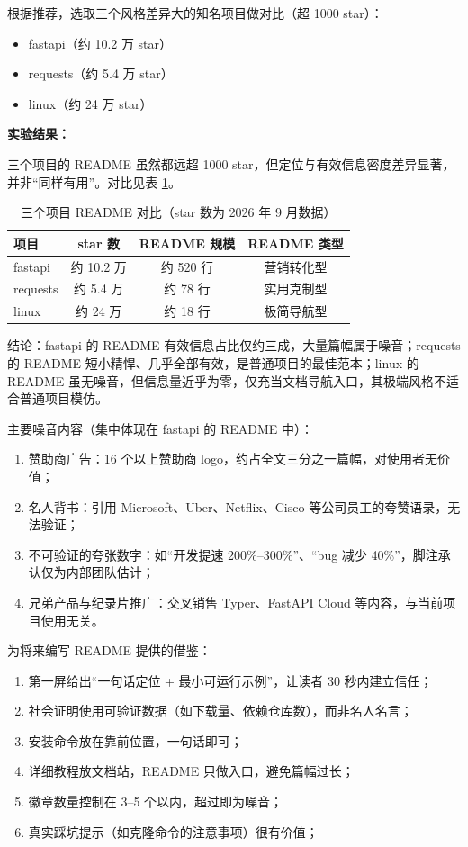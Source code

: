 \documentclass[12pt,a4paper]{article}
\begin{document}
根据推荐，选取三个风格差异大的知名项目做对比（超 1000 star）：
\begin{itemize}
  \item fastapi（约 10.2 万 star）
  \item requests（约 5.4 万 star）
  \item linux（约 24 万 star）
\end{itemize}

\textbf{实验结果：}

三个项目的 README 虽然都远超 1000 star，但定位与有效信息密度差异显著，并非``同样有用''。对比见表 \ref{tab:readme-compare}。

\begin{table}[htbp]
  \centering
  \caption{三个项目 README 对比（star 数为 2026 年 9 月数据）}
  \label{tab:readme-compare}
  \begin{tabular}{lccc}
    \hline
    项目 & star 数 & README 规模 & README 类型 \\
    \hline
    fastapi & 约 10.2 万 & 约 520 行 & 营销转化型 \\
    requests & 约 5.4 万 & 约 78 行 & 实用克制型 \\
    linux & 约 24 万 & 约 18 行 & 极简导航型 \\
    \hline
  \end{tabular}
\end{table}

结论：fastapi 的 README 有效信息占比仅约三成，大量篇幅属于噪音；requests 的 README 短小精悍、几乎全部有效，是普通项目的最佳范本；linux 的 README 虽无噪音，但信息量近乎为零，仅充当文档导航入口，其极端风格不适合普通项目模仿。

主要噪音内容（集中体现在 fastapi 的 README 中）：
\begin{enumerate}
  \item 赞助商广告：16 个以上赞助商 logo，约占全文三分之一篇幅，对使用者无价值；
  \item 名人背书：引用 Microsoft、Uber、Netflix、Cisco 等公司员工的夸赞语录，无法验证；
  \item 不可验证的夸张数字：如``开发提速 200\%--300\%''、``bug 减少 40\%''，脚注承认仅为内部团队估计；
  \item 兄弟产品与纪录片推广：交叉销售 Typer、FastAPI Cloud 等内容，与当前项目使用无关。
\end{enumerate}

为将来编写 README 提供的借鉴：
\begin{enumerate}
  \item 第一屏给出``一句话定位 + 最小可运行示例''，让读者 30 秒内建立信任；
  \item 社会证明使用可验证数据（如下载量、依赖仓库数），而非名人名言；
  \item 安装命令放在靠前位置，一句话即可；
  \item 详细教程放文档站，README 只做入口，避免篇幅过长；
  \item 徽章数量控制在 3--5 个以内，超过即为噪音；
  \item 真实踩坑提示（如克隆命令的注意事项）很有价值；
\end{enumerate}
\end{document}
